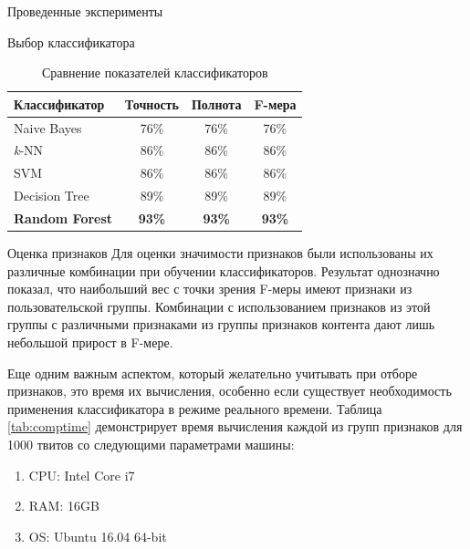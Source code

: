 \begin{section}{Проведенные эксперименты}
\begin{subsection}{Выбор классификатора}
\begin{table}[H]
\centering
{\begin{tabular}{|l|c|c|c|}
\hline
\textbf{Классификатор} & \textbf{Точность} & \textbf{Полнота} & \textbf{F-мера}  \\
\hline
Naive Bayes & 76\% & 76\% & 76\% \\
\hline
\textit{k}-NN & 86\% & 86\% & 86\% \\
\hline
SVM & 86\% & 86\% & 86\%  \\
\hline
Decision Tree & 89\% & 89\% & 89\% \\
\hline
\textbf{Random Forest} & \textbf{93\%} & \textbf{93\%} & \textbf{93\%} \\
\hline
\end{tabular}}
\caption{Сравнение показателей классификаторов}
\label{tab:results}
\end{table}



\end{subsection}


\begin{subsection}{Оценка признаков}
Для оценки значимости признаков были использованы их различные комбинации  при обучении классификаторов. Результат однозначно показал, что наибольший вес с точки зрения F-меры имеют признаки из пользовательской группы. Комбинации с использованием признаков из этой группы с различными признаками из группы признаков контента дают лишь небольшой прирост в F-мере.

Еще одним важным аспектом, который желательно учитывать при отборе признаков, это время их вычисления, особенно если существует необходимость применения классификатора в режиме реального времени. Таблица \ref{tab:comptime} демонстрирует время вычисления каждой из групп признаков для 1000 твитов со следующими параметрами машины:
\begin{enumerate}
\item CPU: Intel Core i7
\item RAM: 16GB
\item OS: Ubuntu 16.04 64-bit
\end{enumerate}



\begin{table}[H]
\centering
{}


\end{table}
\end{subsection}
\end{section}
